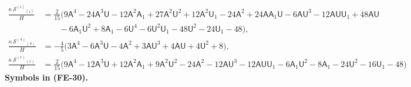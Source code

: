 \documentclass[
  10pt,
]{article}
\begin{document}
\[
\begin{aligned}
\frac{\kappa\,\mathcal{S}^{(i)}{}_{(i)}}{H} &= \frac{2}{15}\big(9\mathsf{A}^4 - 24\mathsf{A}^3\mathsf{U} - 12\mathsf{A}^2\mathsf{A}_1
 + 27\mathsf{A}^2\mathsf{U}^2 + 12\mathsf{A}^2\mathsf{U}_1 - 24\mathsf{A}^2 + 24\mathsf{A}\mathsf{A}_1\mathsf{U} - 6\mathsf{A}\mathsf{U}^3
 - 12\mathsf{A}\mathsf{U}\mathsf{U}_1 + 48\mathsf{A}\mathsf{U}\\
&\qquad - 6\mathsf{A}_1\mathsf{U}^2 + 8\mathsf{A}_1 - 6\mathsf{U}^4 - 6\mathsf{U}^2\mathsf{U}_1 - 48\mathsf{U}^2 - 24\mathsf{U}_1 - 48\big),\\
\frac{\kappa\,\mathcal{S}^{(4)}{}_{(4)}}{H} &= -\frac45\big(3\mathsf{A}^4 - 6\mathsf{A}^3\mathsf{U} - 4\mathsf{A}^2 + 3\mathsf{A}\mathsf{U}^3
 + 4\mathsf{A}\mathsf{U} + 4\mathsf{U}^2 + 8\big),\\
\frac{\kappa\,\mathcal{S}^{(r)}{}_{(r)}}{H} &= \frac{2}{15}\big(9\mathsf{A}^4 - 12\mathsf{A}^3\mathsf{U} + 12\mathsf{A}^2\mathsf{A}_1
 + 9\mathsf{A}^2\mathsf{U}^2 - 24\mathsf{A}^2 - 12\mathsf{A}\mathsf{U}^3 - 12\mathsf{A}\mathsf{U}\mathsf{U}_1 - 6\mathsf{A}_1\mathsf{U}^2 - 8\mathsf{A}_1
 - 24\mathsf{U}^2 - 16\mathsf{U}_1 - 48\big)
\end{aligned} \tag{FE-30}
\] \textbf{Symbols in (FE-30).}
\end{document}
